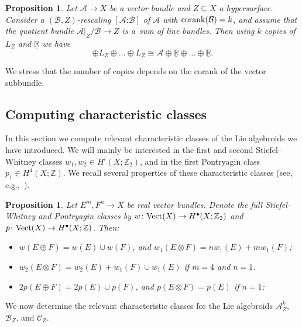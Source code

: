 \documentclass[10pt,a4paper]{amsart}
\numberwithin{equation}{section}
\newtheorem{Proposition}[Theorem]{Proposition}
 { \theoremstyle{definition}
\newtheorem{Definition}[Theorem]{Definition}
\newtheorem{Example}[Theorem]{Example}
\newtheorem{Remark}[Theorem]{Remark} }
\begin{document}
\begin{Proposition}\label{prop:logbundleiso} Let $\mathcal{A} \to X$ be a vector bundle and $Z \subseteq X$ a hypersurface. Consider a $(\mathcal{B},Z)$-rescaling $[\mathcal{A}\text{:}\mathcal{B}]$ of $\mathcal{A}$ with ${\rm corank}(\mathcal{B}) = k$, and assume that the quotient bundle $\mathcal{A}|_Z/\mathcal{B} \to Z$ is a~sum of line bundles. Then using $k$ copies of $L_Z$ and $\underline{\mathbb{R}}$ we have
	\begin{displaymath}
	[\mathcal{A}\text{:}\mathcal{B}] \oplus L_Z \oplus \dots \oplus L_Z \cong \mathcal{A} \oplus \underline{\mathbb{R}} \oplus \dots \oplus \underline{\mathbb{R}}.
	\end{displaymath}
\end{Proposition}

We stress that the number of copies depends on the corank of the vector subbundle.

\subsection{Computing characteristic classes}\label{sec:compcharclasses}

In this section we compute relevant characteristic classes of the Lie algebroids we have introduced. We will mainly be interested in the first and second Stiefel--Whitney classes $w_1, w_2 \in H^{i}(X;\mathbb{Z}_2)$, and in the first Pontryagin class $p_1 \in H^4(X;\mathbb{Z})$. We recall several properties of these characteristic classes (see, e.g.,~\cite{MilnorStasheff74}).
\begin{Proposition}\label{prop:charclasses} Let $E^m, F^n \to X$ be real vector bundles. Denote the full Stiefel--Whitney and Pontryagin classes by $w\colon {\rm Vect}(X) \to H^\bullet(X;\mathbb{Z}_2)$ and $p\colon {\rm Vect}(X) \to H^\bullet(X;\mathbb{Z})$. Then:
	\begin{itemize}\itemsep=0pt
	\item[$i)$] $w(E \oplus F) = w(E) \cup w(F)$, and $w_1(E \otimes F) = n w_1(E) + m w_1(F)$;
	\item[$ii)$] $w_2(E \otimes F) = w_2(E) + w_1(F) \cup w_1(E)$ if $m = 4$ and $n = 1$.
	\item[$iii)$] $2 p(E \oplus F) = 2 p(E) \cup p(F)$, and $p(E \otimes F) = p(E)$ if $n = 1$;
	\end{itemize}
\end{Proposition}

We now determine the relevant characteristic classes for the Lie algebroids $\mathcal{A}_Z^k$, $\mathcal{B}_Z$, and $\mathcal{C}_Z$.
\end{document}
